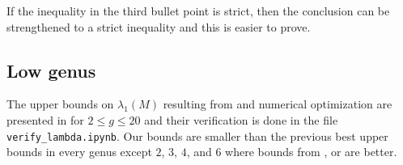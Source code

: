 \documentclass[12pt]{amsart}
\numberwithin{equation}{section}
\begin{document}
\begin{rem}
If the inequality in the third bullet point is strict, then the conclusion can be strengthened to a strict inequality and this is easier to prove. 
\end{rem}

\subsection{Low genus}

The upper bounds on $\lambda_1(M)$ resulting from  and numerical optimization are presented in  for $2\leq g \leq 20$ and their verification is done in the file \texttt{verify\_lambda.ipynb}. Our bounds are smaller than the previous best upper bounds in every genus except $2$, $3$, $4$, and $6$ where bounds from \cite{bootstrap}, \cite{bootstrap2} or \cite{YangYau} are better. 
\end{document}
